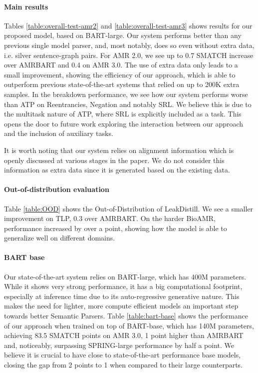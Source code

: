 \documentclass[11pt]{article}
\begin{document}
\paragraph{Main results} Tables  \ref{table:overall-test-amr2} and \ref{table:overall-test-amr3} shows results for our proposed model, based on BART-large. Our system performs better than any previous single model parser, and, most notably, does so even without extra data, i.e. silver sentence-graph pairs. For AMR 2.0, we see up to 0.7 SMATCH increase over AMRBART and 0.4 on AMR 3.0. The use of extra data only leads to a small improvement, showing the efficiency of our approach, which is able to outperform previous state-of-the-art systems that relied on up to 200K extra samples. In the breakdown performance, we see how our system performs worse than ATP on Reentrancies, Negation and notably SRL. We believe this is due to the multitask nature of ATP, where SRL is explicitly included as a task. This opens the door to future work exploring the interaction between our approach and the inclusion of auxiliary tasks.

It is worth noting that our system relies on alignment information which is openly discussed at various stages in the paper. We do not consider this information as extra data since it is generated based on the existing data.

\paragraph{Out-of-distribution evaluation} Table \ref{table:OOD} shows the Out-of-Distribution of LeakDistill. We see a smaller improvement on TLP, 0.3 over AMRBART. On the harder BioAMR, performance increased by over a point, showing how the model is able to generalize well on different domains.


\paragraph{BART base} Our state-of-the-art system relies on BART-large, which has 400M parameters. While it shows very strong performance, it has a big computational footprint, especially at inference time due to its auto-regressive generative nature. This makes the need for lighter, more compute efficient models an important step towards better Semantic Parsers. Table \ref{table:bart-base} shows the performance of our approach when trained on top of BART-base, which has 140M parameters, achieving 83.5 SMATCH points on AMR 3.0, 1 point higher than AMRBART and,  noticeably, surpassing SPRING-large performance by half a point. We believe it is crucial to have close to state-of-the-art performance base models, closing the gap from 2 points to 1 when compared to their large counterparts.
\end{document}
